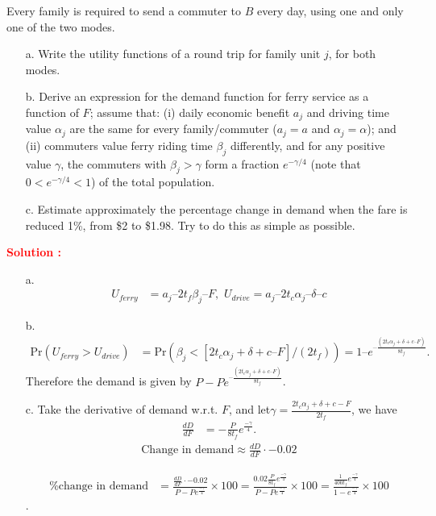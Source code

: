 \documentclass[12pt]{article}
\begin{document}
Every family is required to send a commuter to $B$ every day, using one and only one of the two modes.
\begin{enumerate}
    \item[a.] Write the utility functions of a round trip for family unit $j$, for both modes.
    \item[b.] Derive an expression for the demand function for ferry service as a function of $F$; assume that: (i) daily economic benefit $a_j$ and driving time value $\alpha_j$ are the same for every family/commuter ($a_j = a$ and $\alpha_j = \alpha$); and (ii) commuters value ferry riding time $\beta_j$ differently, and for any positive value $\gamma$, the commuters with $\beta_j > \gamma$ form a fraction $e^{-\gamma/4}$ (note that $0 < e^{-\gamma/4} < 1$) of the total population.
    \item[c.] Estimate approximately the percentage change in demand when the fare is reduced 1\%, from \$2 to \$1.98. Try to do this as simple as possible.
\end{enumerate}

\textbf{\textcolor{red}{Solution :}} \\

\begin{enumerate}
    \item [a.]     \begin{align*}
        U_{ferry} &= a_j – 2 t_f \beta_j – F, \,\,
        U_{drive} = a_j – 2 t_c \alpha_j – \delta – c
    \end{align*}

    \item [b.] 
    \begin{align*}
        \text{Pr} \left(U_{ferry}>U_{drive} \right) &= \text{Pr}\left( \beta_j < [2 t_c \alpha_j + \delta + c – F] / (2 t_f)  \right)                          =1 – e^{– \frac{(2 t_c \alpha_j + \delta + c – F) }{8 t_f} }.
    \end{align*} 
    Therefore the demand is given by $P-Pe^{– \frac{(2 t_c \alpha_j + \delta + c – F) }{8 t_f} }$.
    \item[c.] Take the derivative of demand w.r.t. $F$, and let\(\gamma = \frac{2t_c \alpha_j + \delta + c - F}{2t_f}\), we have
    \begin{align*}
        \frac{dD}{dF} &= -\frac{P}{8t_f}e^{\frac{-\gamma}{4}}.
    \end{align*}
    \begin{align*}
        \text{Change in demand} \approx \frac{dD}{dF} \cdot -0.02
    \end{align*}
    
    \begin{align*}
        \text{\% change in demand} &= \frac{\frac{dD}{dF} \cdot -0.02}{P-Pe^{\frac{-\gamma}{4}}} \times 100
    = \frac{0.02\frac{P}{8t_f}e^{\frac{-\gamma}{4}}}{P-Pe^{\frac{-\gamma}{4}}} \times 100
    = \frac{\frac{1}{400t_f}e^{\frac{-\gamma}{4}}}{1-e^{\frac{-\gamma}{4}}} \times 100
    \end{align*}.
    
    
\end{enumerate}
\end{document}
